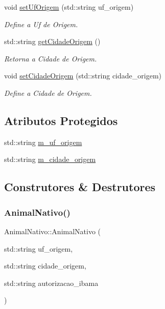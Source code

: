 \begin{DoxyCompactItemize}
void \hyperlink{classAnimalNativo_a4d91de201fea070524bb0c7524116f0a}{set\+Uf\+Origem} (std\+::string uf\+\_\+origem)
\begin{DoxyCompactList}\small\item\em Define a Uf de Origem. \end{DoxyCompactList}\item 
std\+::string \hyperlink{classAnimalNativo_a7f4d471d82fc83b9d76d2bea01127022}{get\+Cidade\+Origem} ()
\begin{DoxyCompactList}\small\item\em Retorna a Cidade de Origem. \end{DoxyCompactList}\item 
void \hyperlink{classAnimalNativo_af28524ef3ada1b047d722e0e969d5cab}{set\+Cidade\+Origem} (std\+::string cidade\+\_\+origem)
\begin{DoxyCompactList}\small\item\em Define a Cidade de Origem. \end{DoxyCompactList}\end{DoxyCompactItemize}
\subsection*{Atributos Protegidos}
\begin{DoxyCompactItemize}
\item 
std\+::string \hyperlink{classAnimalNativo_a5ee01fe0f43cac32ad2b729e99e036b3}{m\+\_\+uf\+\_\+origem}
\item 
std\+::string \hyperlink{classAnimalNativo_a75c1303463bb16fa7c19e7467e43e1e7}{m\+\_\+cidade\+\_\+origem}
\end{DoxyCompactItemize}


\subsection{Construtores \& Destrutores}
\mbox{\label{classAnimalNativo_aeb63658fc124d85a0804c9dd8e05931b}} 
\subsubsection{\texorpdfstring{Animal\+Nativo()}{AnimalNativo()}}
{\footnotesize\ttfamily Animal\+Nativo\+::\+Animal\+Nativo (\begin{DoxyParamCaption}\item[{std\+::string}]{uf\+\_\+origem,  }\item[{std\+::string}]{cidade\+\_\+origem,  }\item[{std\+::string}]{autorizacao\+\_\+ibama }\end{DoxyParamCaption})}



